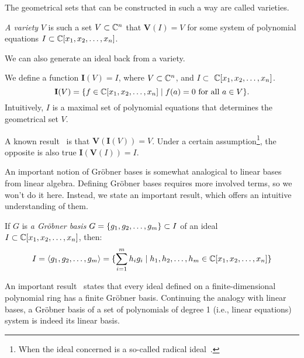 The geometrical sets that can be constructed in such a way are called varieties.
\begin{defn}
\textit{A variety} $V$ is such a set $V \subset \mathbb{C}^n$ that $\textbf{V}(I)=V$ for some system of polynomial equations  $I \subset \mathbb{C}[x_1,x_2, \dots, x_n]$. 
\end{defn}

We can also generate an ideal back from a variety.
\begin{defn}
We define a function $\textbf{I}(V)=I$, where $V \subset \mathbb{C}^n$, and $I \subset$ \( \mathbb{C}[x_1,x_2, \dots, x_n]\). \[\textbf{I}(V) =  \{f \in \mathbb{C}[x_1,x_2, \dots, x_n] \; | \; f(a) = 0 \text{ for all } a \in V \}. \] Intuitively, $I$ is a maximal set of polynomial equations that determines the geometrical set $V$.
\end{defn}

A known result~\cite{Cox1} is that $\textbf{V}(\textbf{I}(V))=V$. Under a certain assumption\footnote{When the ideal concerned is a so-called radical ideal~\cite{Cox1}.}, the opposite is also true $\textbf{I}(\textbf{V}(I))=I$.

An important notion of Gr\"obner bases is somewhat analogical to linear bases from linear algebra. Defining Gr\"obner bases requires more involved terms, so we won't do it here. Instead, we state an important result, which offers an intuitive understanding of them. 
\begin{defn}
If $G$ is \textit{a Gr\"obner basis} $G={\left\{g_1, g_2, \dots, g_m\right\}} \subset I$ of an ideal \\ $I \subset \mathbb{C}[x_1,x_2, \dots, x_n]$, then: \[ I = \langle g_1, g_2, \dots, g_m \rangle = \{  \sum_{i=1}^m h_i g_i \; | \;  h_1, h_2, \dots, h_m \in \mathbb{C}[x_1,x_2, \dots, x_n] \} \]
\end{defn}

An important result~\cite{Cox1} states that every ideal defined on a finite-dimensional polynomial ring has a finite Gr\"obner basis. Continuing the analogy with linear bases, a Gr\"obner basis of a set of polynomials of degree 1 (i.e., linear equations) system is indeed its linear basis.

